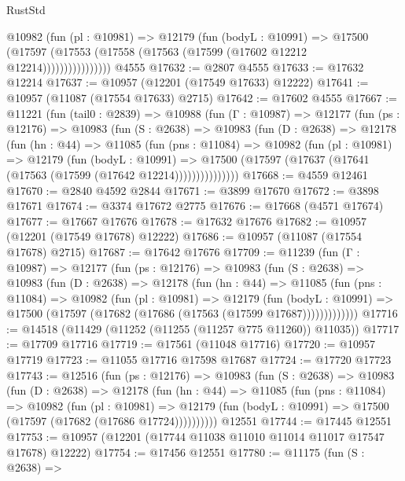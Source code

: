 \begin{lexlean}{RustStd}
\begin{coremodule}
{\begin{coremodule}
{{{{{{{{{{{{{{{{{{{{{{{{{{{{{{{{{                  @10982
                    (fun (pl : @10981) =>
                    @12179
                      (fun (bodyL : @10991) =>
                      @17500
                        (@17597
                          (@17553 (@17558 (@17563 (@17599 (@17602 @12212 @12214))))))))))))))))
    @4555
@17632 := @2807 @4555
@17633 := @17632 @12214
@17637 := @10957 (@12201 (@17549 @17633) @12222)
@17641 := @10957 (@11087 (@17554 @17633) @2715)
@17642 := @17602 @4555
@17667 := @11221
    (fun (tail0 : @2839) =>
    @10988
      (fun (Γ : @10987) =>
      @12177
        (fun (ps : @12176) =>
        @10983
          (fun (S : @2638) =>
          @10983
            (fun (D : @2638) =>
            @12178
              (fun (hn : @44) =>
              @11085
                (fun (pns : @11084) =>
                @10982
                  (fun (pl : @10981) =>
                  @12179
                    (fun (bodyL : @10991) =>
                    @17500 (@17597 (@17637 (@17641 (@17563 (@17599 (@17642 @12214)))))))))))))))
@17668 := @4559 @12461
@17670 := @2840 @4592 @2844
@17671 := @3899 @17670
@17672 := @3898 @17671
@17674 := @3374 @17672 @2775
@17676 := @17668 (@4571 @17674)
@17677 := @17667 @17676
@17678 := @17632 @17676
@17682 := @10957 (@12201 (@17549 @17678) @12222)
@17686 := @10957 (@11087 (@17554 @17678) @2715)
@17687 := @17642 @17676
@17709 := @11239
    (fun (Γ : @10987) =>
    @12177
      (fun (ps : @12176) =>
      @10983
        (fun (S : @2638) =>
        @10983
          (fun (D : @2638) =>
          @12178
            (fun (hn : @44) =>
            @11085
              (fun (pns : @11084) =>
              @10982
                (fun (pl : @10981) =>
                @12179
                  (fun (bodyL : @10991) =>
                  @17500 (@17597 (@17682 (@17686 (@17563 (@17599 @17687)))))))))))))
@17716 := @14518 (@11429 (@11252 (@11255 (@11257 @775 @11260)) @11035))
@17717 := @17709 @17716
@17719 := @17561 (@11048 @17716)
@17720 := @10957 @17719
@17723 := @11055 @17716 @17598 @17687
@17724 := @17720 @17723
@17743 := @12516
    (fun (ps : @12176) =>
    @10983
      (fun (S : @2638) =>
      @10983
        (fun (D : @2638) =>
        @12178
          (fun (hn : @44) =>
          @11085
            (fun (pns : @11084) =>
            @10982
              (fun (pl : @10981) =>
              @12179 (fun (bodyL : @10991) => @17500 (@17597 (@17682 (@17686 @17724))))))))))
    @12551
@17744 := @17445 @12551
@17753 := @10957 (@12201 (@17744 @11038 @11010 @11014 @11017 @17547 @17678) @12222)
@17754 := @17456 @12551
@17780 := @11175
    (fun (S : @2638) =>
}}}}}}}}}}}}}}}}}}}}}}}}}}}}}}}}}
\end{coremodule}}
\end{coremodule}
\end{lexlean}
